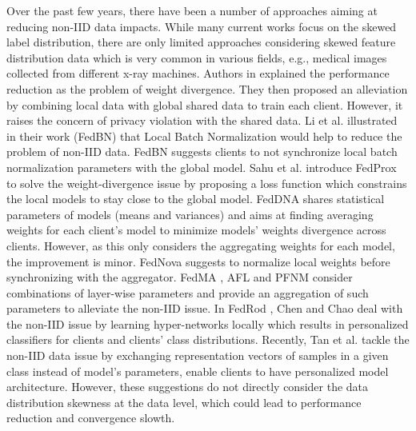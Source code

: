 Over the past few years, there have been a number of approaches aiming at reducing non-IID data impacts. While many current works focus on the skewed label distribution, there are only limited approaches considering skewed feature distribution data which is very common in various fields, e.g., medical images collected from different x-ray machines. Authors in \cite{Zhao2018FederatedLW} explained the performance reduction as the problem of weight divergence. They then proposed an alleviation by combining local data with global shared data to train each client. However, it raises the concern of privacy violation with the shared data. Li et al. illustrated in their work (FedBN) \cite{li2021fedbn} that Local Batch Normalization would help to reduce the problem of non-IID data. FedBN suggests clients to not synchronize local batch normalization parameters with the global model. Sahu et al. introduce FedProx \cite{FedProx} to solve the weight-divergence issue by proposing a loss function which constrains the local models to stay close to the global model. FedDNA \cite{fedDNA} shares statistical parameters of models (means and variances) and aims at finding averaging weights for each client's model to minimize models' weights divergence across clients. However, as this only considers the aggregating weights for each model, the improvement is minor. FedNova \cite{fednova} suggests to normalize local weights before synchronizing with the aggregator. FedMA \cite{fedma}, AFL \cite{AFL} and PFNM \cite{pfnm} consider combinations of layer-wise parameters and provide an aggregation of such parameters to alleviate the non-IID issue. In FedRod \cite{FedRod}, Chen and Chao deal with the non-IID issue by learning hyper-networks locally which results in personalized classifiers for clients and clients' class distributions. Recently, Tan et al. \cite{FedProto} tackle the non-IID data issue by exchanging representation vectors of samples in a given class instead of model's parameters, enable clients to have personalized model architecture. However, these suggestions do not directly consider the data distribution skewness at the data level, which could lead to performance reduction and convergence slowth.    

